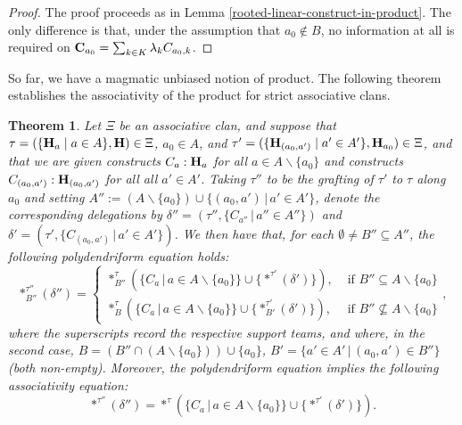 \documentclass[11pt]{article}
\newtheorem{theorem}[theo]{Theorem}
\theoremstyle{definition}
\numberwithin{equation}{section}
\numberwithin{equation}{section}
\newcommand{\nin}{\not\in}
\newcommand{\inc}{\subseteq}
\newcommand{\set}[1]{\{#1\}}
\newcommand{\setc}[2]{\set{#1 \mid #2}}
\newcommand{\hyper}[1]{{\bf #1}}
\begin{document}
\begin{proof} The proof proceeds as in Lemma \ref{rooted-linear-construct-in-product}. The only difference is that, under the assumption that $a_0\nin B$, no information at all is required on ${\bf C}_{a_0}=\sum_{k\in K}  \lambda_k C_{a_0,k}$. 
\end{proof}

So far, we have a magmatic unbiased notion of product. The following theorem establishes the associativity of the product for strict associative clans.

\begin{theorem}\label{assoc_strict}
Let $\Xi$ be an associative clan, and suppose that $\tau = (\setc{\hyper{H}_a}{a\in A},\hyper{H})\in \Xi$, $a_0\in A$, and $\tau'= (\setc{\hyper{H}_{(a_0,a')}}{a'\in A'},\hyper{H}_{a_0})\in\Xi$, 
and that we are given constructs $C_a:\hyper{H}_a$ for all $a\in A\backslash \{a_0\}$ 
and constructs $C_{(a_0,a')}:\hyper{H}_{(a_0,a')}$ for all all $a'\in A'$. Taking $\tau''$ to be the grafting of $\tau'$ to  $\tau$ along $a_0$ and  setting $A'':=(A\backslash\{a_0\})\cup\{(a_0,a')\,|\,a'\in A'\}$, denote the corresponding delegations by $\delta''=(\tau'',\{C_{a''}\,|\,a''\in  A'' \})$ and
 $\delta'=(\tau',\{C_{(a_0,a')}\,|\,a'\in A' \})$.
We then have that, for each $\emptyset\neq B''\subseteq A''$, the following {\em polydendriform equation} holds:
$$
\ast^{\tau''}_{B''}(\delta'')=\begin{cases}
\ast^{\tau}_{B''}(\{C_a\,|\,a\in A\backslash\{a_0\}\}\cup\{\ast^{\tau'}(\delta')\}), & \mbox{ if } B''\subseteq A\backslash\{a_0\}\\
\ast^{\tau}_{B}(\{C_a\,|\,a\in A\backslash\{a_0\}\}\cup \{\ast^{\tau'}_{B'}(\delta')\}), & \mbox{ if } B''\not\inc A\backslash\{a_0\}
\end{cases}
,$$ where the superscripts record the respective support teams, and  where, in the second case, $B=(B''\cap(A\backslash\{a_0\}))\cup\{a_0\}$, $B'=\{a'\in A'\,|\, (a_0,a')\in B''\}$ (both non-empty). Moreover, the polydendriform equation  implies the following associativity equation: $$\ast^{\tau''}(\delta'')=\ast^{\tau}(\{C_a\,|\,a\in A\backslash\{a_0\}\}\cup\{\ast^{\tau'}(\delta')\}).$$ 
\end{theorem}
\end{document}

